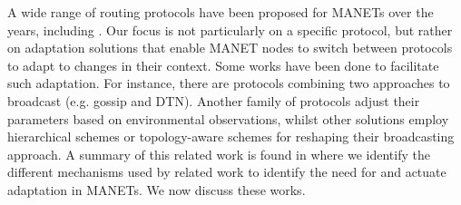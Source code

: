 

A wide range of routing protocols have been proposed for MANETs over the years, including .
Our focus is not particularly on a specific protocol, but rather on adaptation solutions that enable MANET nodes to switch between protocols to adapt to changes in their context. 
Some works have been done to facilitate such adaptation. 
For instance, there are protocols combining two approaches to broadcast (e.g. gossip and DTN).
Another family of protocols adjust their parameters based on environmental observations, whilst other solutions employ hierarchical schemes or topology-aware schemes for reshaping their broadcasting approach.
A summary of this related work is found in  where we identify the different mechanisms used by related work to identify the need for and actuate adaptation in MANETs. 
We now discuss these works.


